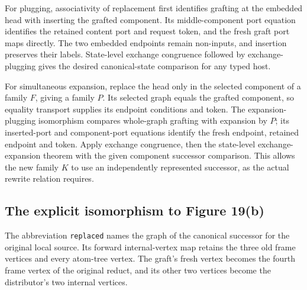 

For plugging, associativity of replacement first identifies grafting at
the embedded head with inserting the grafted component. Its middle-component
port equation identifies the retained content port and request token, and
the fresh graft port maps directly. The two embedded endpoints remain
non-inputs, and insertion preserves their labels. State-level exchange
congruence followed by exchange-plugging gives the desired canonical-state
comparison for any typed host.


For simultaneous expansion, replace the head only in the selected component
of a family $F$, giving a family $P$. Its selected graph equals the grafted
component, so equality transport supplies its endpoint conditions and token.
The expansion-plugging isomorphism compares whole-graph grafting with
expansion by $P$; its inserted-port and component-port equations identify
the fresh endpoint, retained endpoint and token. Apply exchange congruence,
then the state-level exchange-expansion theorem with the given component
successor comparison. This allows the new family $K$ to use an independently
represented successor, as the actual rewrite relation requires.


\subsection{The explicit isomorphism to Figure 19(b)}

The abbreviation \texttt{replaced} names the graph of the canonical
successor for the original local source. Its forward internal-vertex map
retains the three old frame vertices and every atom-tree vertex. The graft's
fresh vertex becomes the fourth frame vertex of the original reduct, and
its other two vertices become the distributor's two internal vertices.


